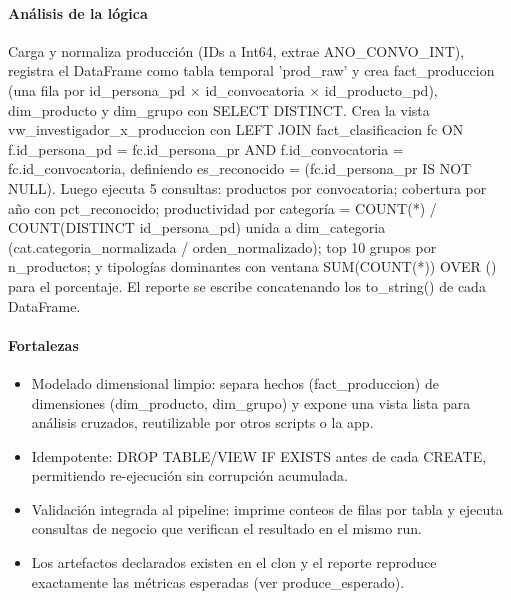 \paragraph{Análisis de la lógica}
Carga y normaliza producción (IDs a Int64, extrae ANO\_CONVO\_INT), registra el DataFrame como tabla temporal 'prod\_raw' y crea fact\_produccion (una fila por id\_persona\_pd $\times$ id\_convocatoria $\times$ id\_producto\_pd), dim\_producto y dim\_grupo con SELECT DISTINCT. Crea la vista vw\_investigador\_x\_produccion con LEFT JOIN fact\_clasificacion fc ON f.id\_persona\_pd = fc.id\_persona\_pr AND f.id\_convocatoria = fc.id\_convocatoria, definiendo es\_reconocido = (fc.id\_persona\_pr IS NOT NULL). Luego ejecuta 5 consultas: productos por convocatoria; cobertura por año con pct\_reconocido; productividad por categoría = COUNT(*) / COUNT(DISTINCT id\_persona\_pd) unida a dim\_categoria (cat.categoria\_normalizada / orden\_normalizado); top 10 grupos por n\_productos; y tipologías dominantes con ventana SUM(COUNT(*)) OVER () para el porcentaje. El reporte se escribe concatenando los to\_string() de cada DataFrame.

\paragraph{Fortalezas}
\begin{itemize}
  \item Modelado dimensional limpio: separa hechos (fact\_produccion) de dimensiones (dim\_producto, dim\_grupo) y expone una vista lista para análisis cruzados, reutilizable por otros scripts o la app.
  \item Idempotente: DROP TABLE/VIEW IF EXISTS antes de cada CREATE, permitiendo re-ejecución sin corrupción acumulada.
  \item Validación integrada al pipeline: imprime conteos de filas por tabla y ejecuta consultas de negocio que verifican el resultado en el mismo run.
  \item Los artefactos declarados existen en el clon y el reporte reproduce exactamente las métricas esperadas (ver produce\_esperado).
\end{itemize}

